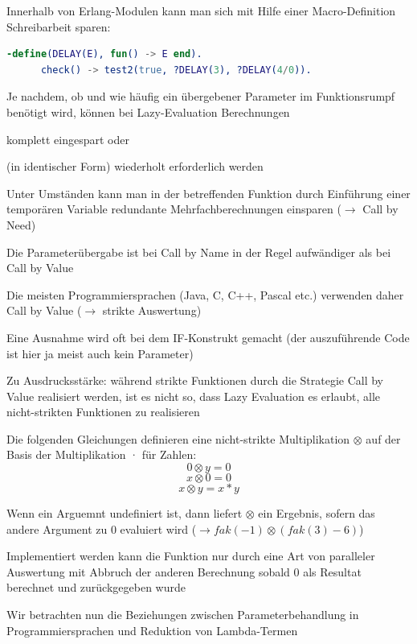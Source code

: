 \documentclass[10pt]{article}
\begin{document}
\begin{itemize*}
\begin{itemize*}
    \item Innerhalb von Erlang-Modulen kann man sich mit Hilfe einer Macro-Definition Schreibarbeit sparen:
    \begin{lstlisting}[language=erlang] 
      -define(DELAY(E), fun() -> E end).
      check() -> test2(true, ?DELAY(3), ?DELAY(4/0)).
    \end{lstlisting}
  \end{itemize*}
  \item Je nachdem, ob und wie häufig ein übergebener Parameter im Funktionsrumpf benötigt wird, können bei Lazy-Evaluation Berechnungen
  \begin{itemize*}
    \item komplett eingespart oder
    \item (in identischer Form) wiederholt erforderlich werden
    \item Unter Umständen kann man in der betreffenden Funktion durch Einführung einer temporären Variable redundante Mehrfachberechnungen einsparen ($\rightarrow$ Call by Need)
  \end{itemize*}
  \item Die Parameterübergabe ist bei Call by Name in der Regel aufwändiger als bei Call by Value
  \begin{itemize*}
    \item Die meisten Programmiersprachen (Java, C, C++, Pascal etc.) verwenden daher Call by Value ($\rightarrow$ strikte Auswertung)
    \item Eine Ausnahme wird oft bei dem IF-Konstrukt gemacht (der auszuführende Code ist hier ja meist auch kein Parameter)
  \end{itemize*}
  \item Zu Ausdrucksstärke: während strikte Funktionen durch die Strategie Call by Value realisiert werden, ist es nicht so, dass Lazy Evaluation es erlaubt, alle nicht-strikten Funktionen zu realisieren
  \begin{itemize*}
    \item Die folgenden Gleichungen definieren eine nicht-strikte Multiplikation $\otimes$ auf der Basis der Multiplikation · für Zahlen:
    $$0 \otimes y = 0$$
    $$x \otimes 0 = 0$$
    $$x \otimes y = x * y$$
    \item Wenn ein Arguemnt undefiniert ist, dann liefert $\otimes$ ein Ergebnis, sofern das andere Argument zu 0 evaluiert wird ($\rightarrow fak(-1) \otimes (fak(3)-6)$)
    \item Implementiert werden kann die Funktion nur durch eine Art von paralleler Auswertung mit Abbruch der anderen Berechnung sobald 0 als Resultat berechnet und zurückgegeben wurde
  \end{itemize*}
  \item Wir betrachten nun die Beziehungen zwischen Parameterbehandlung in Programmiersprachen und Reduktion von Lambda-Termen
\end{itemize*}
\end{document}
